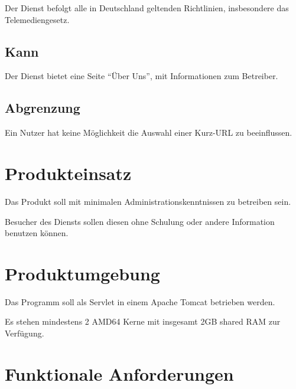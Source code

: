 \documentclass[parskip=full,11pt,twoside]{scrartcl}
\begin{document}


Der Dienst befolgt alle in Deutschland geltenden Richtlinien,
insbesondere das Telemediengesetz.

\subsection{Kann}



Der Dienst bietet eine Seite \enquote{Über Uns},
mit Informationen zum Betreiber.

\subsection{Abgrenzung}


Ein Nutzer hat keine Möglichkeit die Auswahl einer Kurz-URL zu beeinflussen.

\pagebreak
\section{Produkteinsatz}

Das Produkt soll mit minimalen Administrationskenntnissen zu betreiben sein.

Besucher des Diensts sollen diesen ohne Schulung oder andere Information benutzen können.

\section{Produktumgebung}

Das Programm soll als Servlet in einem Apache Tomcat betrieben werden.

Es stehen mindestens 2 AMD64 Kerne mit insgesamt 2GB shared RAM zur Verfügung.

\section{Funktionale Anforderungen}

\end{document}
